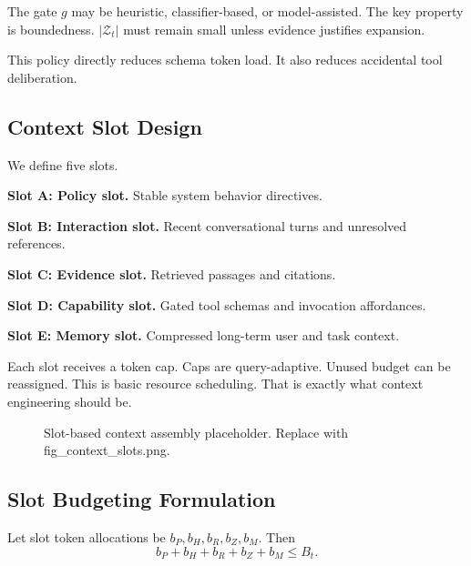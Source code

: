 \documentclass[conference]{IEEEtran}
\begin{document}
The gate $g$ may be heuristic,
classifier-based,
or model-assisted.
The key property is boundedness.
$|\mathcal{Z}_t|$ must remain small unless evidence justifies expansion.

This policy directly reduces schema token load.
It also reduces accidental tool deliberation.

\subsection{Context Slot Design}

We define five slots.

\textbf{Slot A: Policy slot.}
Stable system behavior directives.

\textbf{Slot B: Interaction slot.}
Recent conversational turns and unresolved references.

\textbf{Slot C: Evidence slot.}
Retrieved passages and citations.

\textbf{Slot D: Capability slot.}
Gated tool schemas and invocation affordances.

\textbf{Slot E: Memory slot.}
Compressed long-term user and task context.

Each slot receives a token cap.
Caps are query-adaptive.
Unused budget can be reassigned.
This is basic resource scheduling.
That is exactly what context engineering should be.

\begin{figure}[H]
\centering
{}
\caption{Slot-based context assembly placeholder. Replace with fig\_context\_slots.png.}
\label{fig:context_slots}
\end{figure}

\subsection{Slot Budgeting Formulation}

Let slot token allocations be $b_P,b_H,b_R,b_Z,b_M$.
Then
\begin{equation}
b_P+b_H+b_R+b_Z+b_M \le B_t.
\end{equation}
\end{document}
